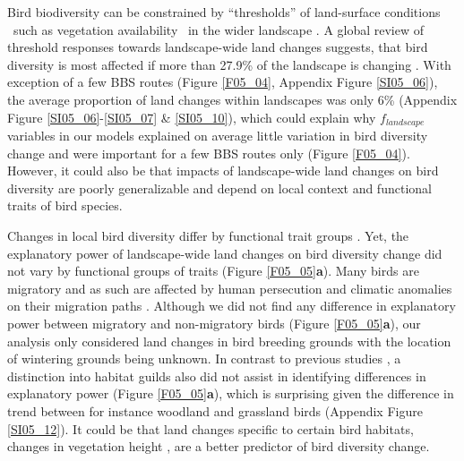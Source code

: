 Bird biodiversity can be constrained by “thresholds” of land-surface conditions \textendash\ such as vegetation availability \textendash\ in the wider landscape \citep{Andersen2009,Gutzwiller2015}. A global review of threshold responses towards landscape-wide land changes suggests, that bird diversity is most affected if more than 27.9\% of the landscape is changing \citep{Melo2018}. With exception of a few BBS routes (Figure \ref{F05_04}, Appendix Figure \ref{SI05_06}), the average proportion of land changes within landscapes was only 6\% (Appendix Figure \ref{SI05_06}-\ref{SI05_07} \& \ref{SI05_10}), which could explain why $f_{landscape}$ variables in our models explained on average little variation in bird diversity change and were important for a few BBS routes only (Figure \ref{F05_04}). However, it could also be that impacts of landscape-wide land changes on bird diversity are poorly generalizable and depend on local context and functional traits of bird species. 

Changes in local bird diversity differ by functional trait groups \citep[Appendix Figure \ref{SI05_12},][]{Jarzyna2017,Barnagaud2017}. Yet, the explanatory power of landscape-wide land changes on bird diversity change did not vary by functional groups of traits (Figure \ref{F05_05}\textbf{a}). Many birds are migratory and as such are affected by human persecution and climatic anomalies on their migration paths \citep{Sanderson2006,Tottrup2012}. Although we did not find any difference in explanatory power between migratory and non-migratory birds (Figure \ref{F05_05}\textbf{a}), our analysis only considered land changes in bird breeding grounds with the location of wintering grounds being unknown. In contrast to previous studies \citep{Schipper2016}, a distinction into habitat guilds also did not assist in identifying differences in explanatory power (Figure \ref{F05_05}\textbf{a}), which is surprising given the difference in trend between for instance woodland and grassland birds (Appendix Figure \ref{SI05_12}). It could be that land changes specific to certain bird habitats, \eg changes in vegetation height \citep{Goetz2014}, are a better predictor of bird diversity change. 

